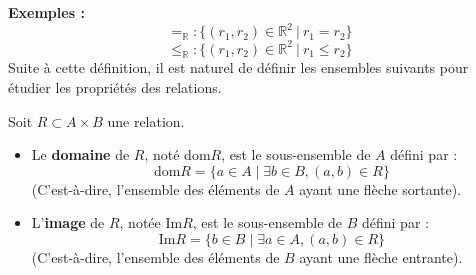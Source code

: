 \begin{center} %
\end{center}
\textbf{Exemples :}\\
\[
=_{\mathbb{R}}:\{(r_1,r_2)\in \mathbb{R}^2\:|\:r_1=r_2\}
\]
\[
\leq_{\mathbb{R}}:\{ (r_1,r_2)\in \mathbb{R}^2 \: |\: r_1\leq r_2 \}
\]
Suite à cette définition, il est naturel de définir les ensembles suivants pour étudier les propriétés des relations.
\begin{definition} 
Soit \( R \subset A \times B \) une relation.  

\begin{itemize}
    \item Le \textbf{domaine} de \( R \), noté \( \text{dom} R \), est le sous-ensemble de \( A \) défini par :  
    \[
    \text{dom} R = \{ a \in A \mid \exists b \in B, (a, b) \in R \}
    \]
    (C'est-à-dire, l'ensemble des éléments de \( A \) ayant une flèche sortante).
    
    \item L'\textbf{image} de \( R \), notée \( \text{Im} R \), est le sous-ensemble de \( B \) défini par :  
    \[
    \text{Im} R = \{ b \in B \mid \exists a \in A, (a, b) \in R \}
    \]
    (C'est-à-dire, l'ensemble des éléments de \( B \) ayant une flèche entrante).
\end{itemize}
\end{definition}

